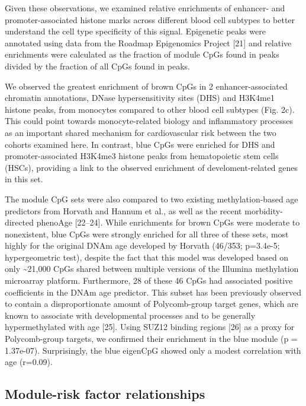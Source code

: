 \documentclass[]{bmcart}
\theoremstyle{definition}
\theoremstyle{definition}
\theoremstyle{definition}
\theoremstyle{remark}
\begin{document}
Given these observations, we examined relative enrichments of enhancer-
and promoter-associated histone marks across different blood cell
subtypes to better understand the cell type specificity of this signal.
Epigenetic peaks were annotated using data from the Roadmap Epigenomics
Project {[}21{]} and relative enrichments were calculated as the
fraction of module CpGs found in peaks divided by the fraction of all
CpGs found in peaks.

We observed the greatest enrichment of brown CpGs in 2
enhancer-associated chromatin annotations, DNase hypersensitivity sites
(DHS) and H3K4me1 histone peaks, from monocytes compared to other blood
cell subtypes (Fig. 2c). This could point towards monocyte-related
biology and inflammatory processes as an important shared mechanism for
cardiovascular risk between the two cohorts examined here. In contrast,
blue CpGs were enriched for DHS and promoter-associated H3K4me3 histone
peaks from hematopoietic stem cells (HSCs), providing a link to the
observed enrichment of develoment-related genes in this set.

The module CpG sets were also compared to two existing methylation-based
age predictors from Horvath and Hannum et al., as well as the recent
morbidity-directed phenoAge {[}22--24{]}. While enrichments for brown
CpGs were moderate to nonexistent, blue CpGs were strongly enriched for
all three of these sets, most highly for the original DNAm age developed
by Horvath (46/353; p=3.4e-5; hypergeometric test), despite the fact
that this model was developed based on only \textasciitilde{}21,000 CpGs
shared between multiple versions of the Illumina methylation microarray
platform. Furthermore, 28 of these 46 CpGs had associated positive
coefficients in the DNAm age predictor. This subset has been previously
observed to contain a disproportionate amount of Polycomb-group target
genes, which are known to associate with developmental processes and to
be generally hypermethylated with age {[}25{]}. Using SUZ12 binding
regions {[}26{]} as a proxy for Polycomb-group targets, we confirmed
their enrichment in the blue module (p = 1.37e-07). Surprisingly, the
blue eigenCpG showed only a modest correlation with age (r=0.09).

\subsection{Module-risk factor
relationships}\label{module-risk-factor-relationships}
\end{document}

